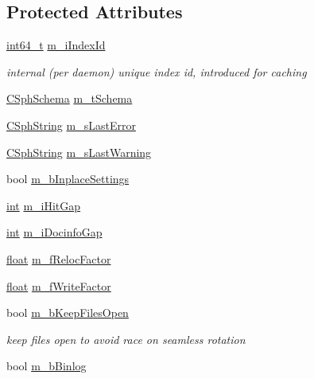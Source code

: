 \subsection*{Protected Attributes}
\begin{DoxyCompactItemize}
\item 
\hyperlink{sphinxstd_8h_a996e72f71b11a5bb8b3b7b6936b1516d}{int64\-\_\-t} \hyperlink{classCSphIndex_a8ae2f46aba9bad2c0f7531aa575ce281}{m\-\_\-i\-Index\-Id}
\begin{DoxyCompactList}\small\item\em internal (per daemon) unique index id, introduced for caching \end{DoxyCompactList}\item 
\hyperlink{classCSphSchema}{C\-Sph\-Schema} \hyperlink{classCSphIndex_af5bf057700ea6e47138e5205ab6b2271}{m\-\_\-t\-Schema}
\item 
\hyperlink{structCSphString}{C\-Sph\-String} \hyperlink{classCSphIndex_a13594dfa32e5cc173f2597be8c7e5446}{m\-\_\-s\-Last\-Error}
\item 
\hyperlink{structCSphString}{C\-Sph\-String} \hyperlink{classCSphIndex_abf793551148df7d12d6f0f617c661a62}{m\-\_\-s\-Last\-Warning}
\item 
bool \hyperlink{classCSphIndex_aa7d5d09a537af3ed6eb762570a9cb3a6}{m\-\_\-b\-Inplace\-Settings}
\item 
\hyperlink{sphinxexpr_8cpp_a4a26e8f9cb8b736e0c4cbf4d16de985e}{int} \hyperlink{classCSphIndex_ae5b594b9f554e4ac3834b036a607b7d7}{m\-\_\-i\-Hit\-Gap}
\item 
\hyperlink{sphinxexpr_8cpp_a4a26e8f9cb8b736e0c4cbf4d16de985e}{int} \hyperlink{classCSphIndex_a0accfb5de7e4b7bca3f7a10d7b474783}{m\-\_\-i\-Docinfo\-Gap}
\item 
\hyperlink{sphinxexpr_8cpp_a0e0d0739f7035f18f949c2db2c6759ec}{float} \hyperlink{classCSphIndex_ab2ad9d5e97093a039d0533df7e8ccb66}{m\-\_\-f\-Reloc\-Factor}
\item 
\hyperlink{sphinxexpr_8cpp_a0e0d0739f7035f18f949c2db2c6759ec}{float} \hyperlink{classCSphIndex_a44998540bf7252632a40e03359c5c7cd}{m\-\_\-f\-Write\-Factor}
\item 
bool \hyperlink{classCSphIndex_a54274ee85403084d17762c73f66039ab}{m\-\_\-b\-Keep\-Files\-Open}
\begin{DoxyCompactList}\small\item\em keep files open to avoid race on seamless rotation \end{DoxyCompactList}\item 
bool \hyperlink{classCSphIndex_afbb7b3842ba5ed3e91cf39509eb2a0fc}{m\-\_\-b\-Binlog}

\end{DoxyCompactItemize}
